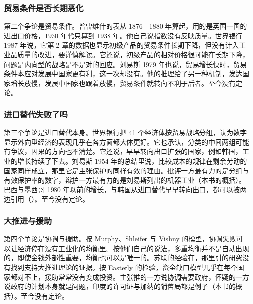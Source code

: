\subsubsection{贸易条件是否长期恶化}

第二个争论是贸易条件。普雷维什的表从 1876—1880 年算起，用的是英国一国的进出口价格，1930 年代只算到 1938 年\cite{prebisch1950}。他自己说指数没有反映质量。世界银行 1987 年说，它第 2 章的数据也显示初级产品的贸易条件长期下降，但没有计入工业品质量的改进，要谨慎解读\cite{wdr1987}。它还说，初级产品的相对价格很可能在长期下降，问题是内向型的战略是不是对的回应\cite{wdr1987}。刘易斯 1979 年也说，贸易增长快时，贸易条件本应对发展中国家更有利，这一次却没有\cite{lewis1979}。他的推理给了另一种机制，发达国家增长放慢，发展中国家也跟着放慢，贸易条件就转向不利于后者\cite{lewis1979}。至今没有定论。

\subsubsection{进口替代失败了吗}

第三个争论是进口替代本身。世界银行把 41 个经济体按贸易战略分组，认为数字显示外向型经济的表现几乎在各方面都大体更好\cite{wdr1987}。它也承认，分类的中间两组可能有争议，因果的方向也不清楚\cite{wdr1987}。它还说，早早转向出口扩张的国家，例如韩国，工业的增长持续了下去\cite{wdr1987}。刘易斯 1954 年的总结里说，比较成本的规律在剩余劳动的国家同样成立，那里它是主张保护的同样有效的理由\cite{lewis1954}。批评一方最有力的是分组与有效保护率的数字，辩护一方最有力的是刘易斯列出的机器工业（本书的概括）。巴西与墨西哥 1980 年以前的增长，与韩国从进口替代早早转向出口，都可以被两边引用（）。至今没有定论。

\subsubsection{大推进与援助}

第四个争论是协调与援助。按 Murphy、Shleifer 与 Vishny 的模型，协调失败可以让经济停在没有工业化的均衡里\cite{msv1988}。按他们自己的说法，多重均衡并不是自动出现的，即使金钱外部性重要，均衡也可以是唯一的\cite{msv1988}。苏联的经验在，那里引的研究没有找到支持大推进理论的证据\cite{cggt2013}。按 Easterly 的检验，资金缺口模型几乎在每个国家都对不上，援助常常没有变成投资\cite{easterly1997}。主张推的一方说协调需要政府，怀疑的一方说政府的计划本身就是问题，印度的许可证与加纳的销售局都是例子（本书的概括）。至今没有定论。

